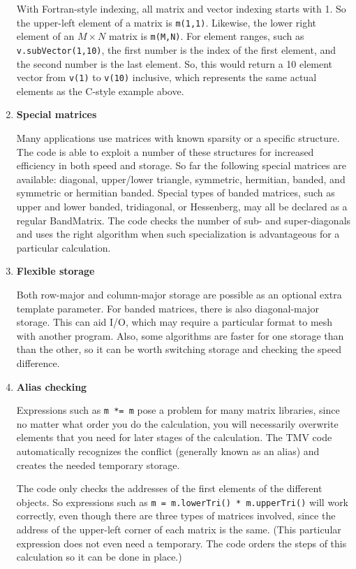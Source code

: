 \documentclass[twoside,letterpaper,11pt]{article}
\renewcommand{\tt}[1]{{\lstinline {#1}}}
\begin{document}
\begin{enumerate}
With Fortran-style indexing, all matrix and vector indexing starts with 1.
So the upper-left element of a matrix is \tt{m(1,1)}.  Likewise, the lower right
element of an $M \times N$ matrix is \tt{m(M,N)}.  For element ranges, such as
\tt{v.subVector(1,10)}, the first number is the index of the first element, and
the second number is the last element.  So, this would return a 10 element vector
from \tt{v(1)} to \tt{v(10)} inclusive, which represents the same actual elements 
as the C-style example above.

\item
\textbf{Special matrices}

Many applications use matrices with known sparsity or a specific structure.  
The code is able to exploit a number of these structures for increased
efficiency in both speed and storage.  So far the following special matrices are
available: diagonal, upper/lower triangle, symmetric, hermitian, banded, and 
symmetric or hermitian banded.  
Special types of banded matrices, such as 
upper and lower banded, tridiagonal, or Hessenberg, may all be declared as a 
regular BandMatrix.  The code checks the number of sub- and super-diagonals 
and uses the right algorithm when such specialization is advantageous for a 
particular calculation.

\item
\textbf{Flexible storage}

Both row-major and column-major storage are possible as an optional
extra template parameter.
For banded matrices, there is also diagonal-major storage.
This can aid I/O, which may require a particular format to mesh with another
program.  Also, some algorithms 
are faster for one storage than than the other, so it can be worth switching storage
and checking the speed difference.

\item
\textbf{Alias checking}

Expressions such as \tt{m *= m} pose a problem for many matrix libraries, since
no matter what order you do the calculation, you will necessarily overwrite elements 
that you need for later stages of the calculation.  
The TMV code automatically recognizes the
conflict (generally known as an alias) and creates the needed temporary storage.

The code only checks the addresses of the first elements of the different objects.
So expressions such as \tt{m = m.lowerTri() * m.upperTri()} will work
correctly, even though there are three types of matrices involved, since the 
address of the upper-left corner of each matrix is the same.  (This particular
expression does not even need a temporary.  The code orders the steps of this
calculation so it can be done in place.)


\end{enumerate}
\end{document}
